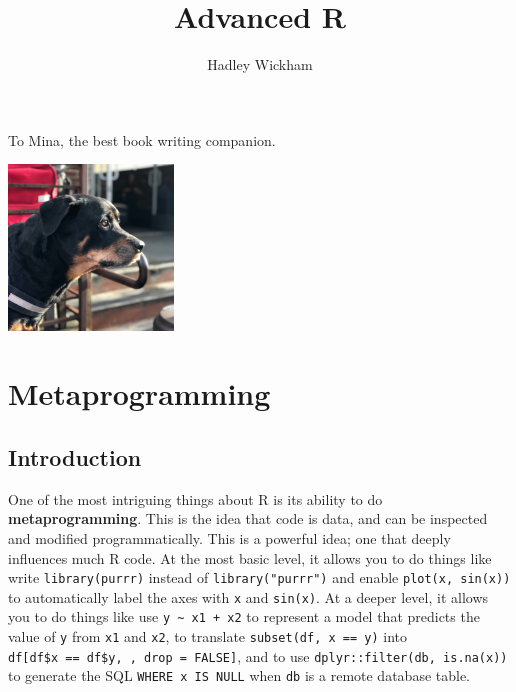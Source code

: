 \documentclass[]{book}
\title{Advanced R}
\author{Hadley Wickham}
\date{}
\begin{document}
\maketitle


\thispagestyle{empty}

\begin{center}
To Mina, the best book writing companion.

\includegraphics[width=0.33\textwidth]{mina.jpg}

\end{center}

\setlength{\abovedisplayskip}{-5pt}
\setlength{\abovedisplayshortskip}{-5pt}

{
\setcounter{tocdepth}{1}
\tableofcontents
}
\hypertarget{part-metaprogramming}{%
\part{Metaprogramming}\label{part-metaprogramming}}

\hypertarget{metaprogramming}{%
\chapter*{Introduction}\label{metaprogramming}}


One of the most intriguing things about R is its ability to do \textbf{metaprogramming}. This is the idea that code is data, and can be inspected and modified programmatically. This is a powerful idea; one that deeply influences much R code. At the most basic level, it allows you to do things like write \texttt{library(purrr)} instead of \texttt{library("purrr")} and enable \texttt{plot(x,\ sin(x))} to automatically label the axes with \texttt{x} and \texttt{sin(x)}. At a deeper level, it allows you to do things like use \texttt{y\ \textasciitilde{}\ x1\ +\ x2} to represent a model that predicts the value of \texttt{y} from \texttt{x1} and \texttt{x2}, to translate \texttt{subset(df,\ x\ ==\ y)} into \texttt{df{[}df\$x\ ==\ df\$y,\ ,\ drop\ =\ FALSE{]}}, and to use \texttt{dplyr::filter(db,\ is.na(x))} to generate the SQL \texttt{WHERE\ x\ IS\ NULL} when \texttt{db} is a remote database table.
\end{document}
